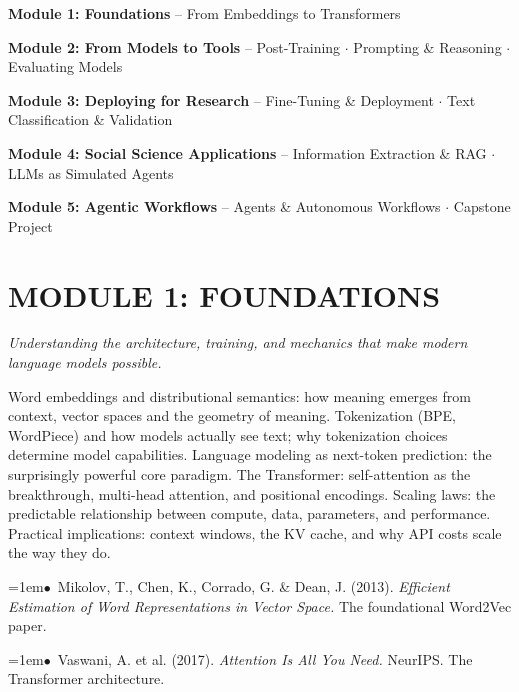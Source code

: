 \documentclass[11pt, a4paper]{article}
\newcommand{\topichead}[1]{%
  \vspace{0.8em}{\large\sffamily\bfseries\textcolor{accent}{#1}}\par\vspace{0.3em}
}
\newcommand{\seclabel}[1]{%
  \vspace{0.5em}{\normalsize\sffamily\bfseries\textcolor{accent}{#1}}\par\vspace{0.2em}
}
\newcommand{\refpaper}[1]{%
  \par\hangindent=1em\hangafter=1\noindent\textcolor{accent}{\small$\bullet$}~{\small #1}\par
}
\begin{document}
{\small\sffamily
\textbf{\textcolor{accent}{Module 1:} \textcolor{dark}{Foundations}} -- From Embeddings to Transformers

\textbf{\textcolor{accent}{Module 2:} \textcolor{dark}{From Models to Tools}} -- Post-Training $\cdot$ Prompting \& Reasoning $\cdot$ Evaluating Models

\textbf{\textcolor{accent}{Module 3:} \textcolor{dark}{Deploying for Research}} -- Fine-Tuning \& Deployment $\cdot$ Text Classification \& Validation

\textbf{\textcolor{accent}{Module 4:} \textcolor{dark}{Social Science Applications}} -- Information Extraction \& RAG $\cdot$ LLMs as Simulated Agents

\textbf{\textcolor{accent}{Module 5:} \textcolor{dark}{Agentic Workflows}} -- Agents \& Autonomous Workflows $\cdot$ Capstone Project
}

\section{MODULE 1: FOUNDATIONS}
{\textit{\textcolor{muted}{Understanding the architecture, training, and mechanics that make modern language models possible.}}}

\vspace{1em}

\topichead{From Embeddings to Transformers}

\seclabel{Core Concepts}

Word embeddings and distributional semantics: how meaning emerges from context, vector spaces and the geometry of meaning. Tokenization (BPE, WordPiece) and how models actually see text; why tokenization choices determine model capabilities. Language modeling as next-token prediction: the surprisingly powerful core paradigm. The Transformer: self-attention as the breakthrough, multi-head attention, and positional encodings. Scaling laws: the predictable relationship between compute, data, parameters, and performance. Practical implications: context windows, the KV cache, and why API costs scale the way they do.

\seclabel{Core Readings}

\refpaper{Mikolov, T., Chen, K., Corrado, G. \& Dean, J. (2013). \textit{Efficient Estimation of Word Representations in Vector Space.} The foundational Word2Vec paper.}

\refpaper{Vaswani, A. et al. (2017). \textit{Attention Is All You Need.} NeurIPS. The Transformer architecture.}
\end{document}
